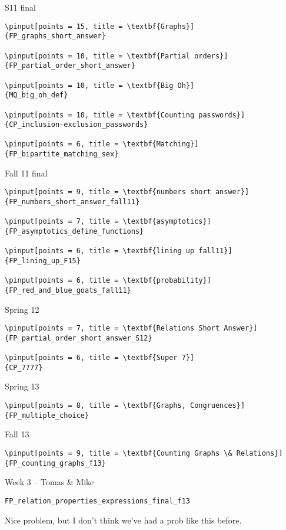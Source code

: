 \documentclass[quiz]{mcs}
\begin{document}
\begin{staffnotes}
S11 final

\begin{verbatim}
\pinput[points = 15, title = \textbf{Graphs}]
{FP_graphs_short_answer}

\pinput[points = 10, title = \textbf{Partial orders}]
{FP_partial_order_short_answer}

\pinput[points = 10, title = \textbf{Big Oh}]
{MQ_big_oh_def}

\pinput[points = 10, title = \textbf{Counting passwords}]
{CP_inclusion-exclusion_passwords}

\pinput[points = 6, title = \textbf{Matching}]
{FP_bipartite_matching_sex}
\end{verbatim}

Fall 11 final

\begin{verbatim}
\pinput[points = 9, title = \textbf{numbers short answer}]
{FP_numbers_short_answer_fall11}

\pinput[points = 7, title = \textbf{asymptotics}]
{FP_asymptotics_define_functions}

\pinput[points = 6, title = \textbf{lining up fall11}]
{FP_lining_up_F15}

\pinput[points = 6, title = \textbf{probability}]
{FP_red_and_blue_goats_fall11}
\end{verbatim}

Spring 12

\begin{verbatim}
\pinput[points = 7, title = \textbf{Relations Short Answer}]
{FP_partial_order_short_answer_S12}

\pinput[points = 6, title = \textbf{Super 7}]
{CP_7777}
\end{verbatim}

Spring 13

\begin{verbatim}
\pinput[points = 8, title = \textbf{Graphs, Congruences}]
{FP_multiple_choice}
\end{verbatim}

Fall 13

\begin{verbatim}
\pinput[points = 9, title = \textbf{Counting Graphs \& Relations}]
{FP_counting_graphs_f13}
\end{verbatim}

\begin{center}
{\large Week 3 -- Tomas \& Mike}
\end{center}
\begin{verbatim}
FP_relation_properties_expressions_final_f13
\end{verbatim}
Nice problem, but I don't think we've had a prob like this before.


\end{staffnotes}
\end{document}
